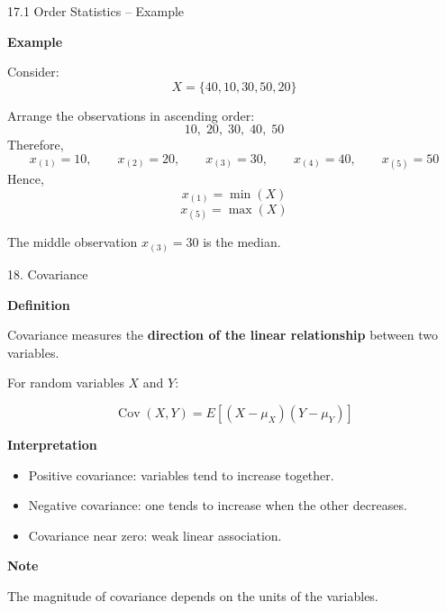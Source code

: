 \begin{frame}{17.1 Order Statistics -- Example}

\textbf{Example}

Consider:
\[
X=\{40,10,30,50,20\}
\]

Arrange the observations in ascending order:
\[
10,\;20,\;30,\;40,\;50
\]
Therefore,
\[
x_{(1)}=10,\qquad
x_{(2)}=20,\qquad
x_{(3)}=30,\qquad
x_{(4)}=40,\qquad
x_{(5)}=50
\]
Hence,
\[
\boxed{x_{(1)}=\min(X)}
\]
\[
\boxed{x_{(5)}=\max(X)}
\]

The middle observation $x_{(3)}=30$ is the median.

\end{frame}



\begin{frame}{18. Covariance}

\textbf{Definition}

Covariance measures the \textbf{direction of the linear
relationship} between two variables.

\vspace{0.4cm}

For random variables $X$ and $Y$:

\[
\boxed{
\operatorname{Cov}(X,Y)
=
E[(X-\mu_X)(Y-\mu_Y)]
}
\]

\vspace{0.4cm}

\textbf{Interpretation}

\begin{itemize}
    \item Positive covariance: variables tend to increase together.
    \item Negative covariance: one tends to increase when the other decreases.
    \item Covariance near zero: weak linear association.
\end{itemize}

\vspace{0.3cm}

\textbf{Note}

The magnitude of covariance depends on the units of the variables.

\end{frame}



